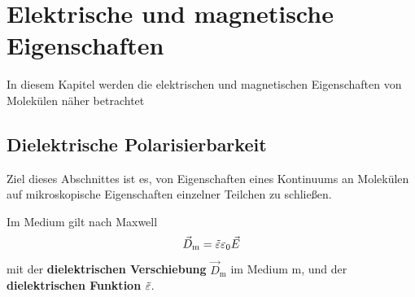 \clearpage
\section{Elektrische und magnetische Eigenschaften}
\begin{verbal}
    In diesem Kapitel werden die elektrischen und magnetischen Eigenschaften von Molekülen näher betrachtet
\end{verbal}
\subsection{Dielektrische Polarisierbarkeit}
    Ziel dieses Abschnittes ist es, von Eigenschaften eines Kontinuums an Molekülen auf mikroskopische Eigenschaften einzelner Teilchen zu schließen.\par

    Im Medium gilt nach Maxwell
    \begin{equation}
        \vec{D}_\text{m} = \tilde{ \varepsilon }\varepsilon_0\vec{E}
    \end{equation}
    mit der \textbf{dielektrischen Verschiebung} ${\vec{D}_\text{m}}$ im Medium m, und der \textbf{dielektrischen Funktion} ${\tilde{\varepsilon}}$. \\
    
